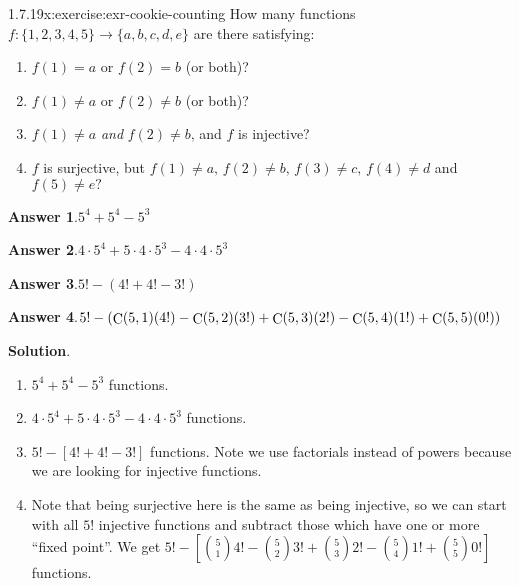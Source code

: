 \documentclass[twoside,11pt,]{book}
\newcommand{\blocktitlefont}{\relax}
\numberwithin{equation}{chapter}
\begin{document}
\begin{divisionsolution}{1.7.19}{}{x:exercise:exr-cookie-counting}%
How many functions \(f: \{1,2,3,4,5\} \to \{a,b,c,d,e\}\) are there satisfying:%
\begin{enumerate}[label=(\alph*)]
\item{}\(f(1) = a\) or \(f(2) = b\) (or both)?%
\item{}\(f(1) \ne a\) or \(f(2) \ne b\) (or both)?%
\item{}\(f(1) \ne a\) \emph{and} \(f(2) \ne b\text{,}\) and \(f\) is injective?%
\item{}\(f\) is surjective, but \(f(1) \ne a\text{,}\) \(f(2) \ne b\text{,}\) \(f(3) \ne c\text{,}\) \(f(4) \ne d\) and \(f(5) \ne e\text{?}\)%
\end{enumerate}
%
\par\smallskip%
\noindent\textbf{\blocktitlefont Answer 1}.\quad{}\(5^{4}+5^{4}-5^{3}\)%
\par\smallskip%
\noindent\textbf{\blocktitlefont Answer 2}.\quad{}\(4\cdot 5^{4}+5\cdot 4\cdot 5^{3}-4\cdot 4\cdot 5^{3}\)%
\par\smallskip%
\noindent\textbf{\blocktitlefont Answer 3}.\quad{}\(5!-\left(4!+4!-3!\right)\)%
\par\smallskip%
\noindent\textbf{\blocktitlefont Answer 4}.\quad{}\(5!-\left(\mathop{\rm C}\nolimits\!\left(5,1\right)\!\left(4!\right)-\mathop{\rm C}\nolimits\!\left(5,2\right)\!\left(3!\right)+\mathop{\rm C}\nolimits\!\left(5,3\right)\!\left(2!\right)-\mathop{\rm C}\nolimits\!\left(5,4\right)\!\left(1!\right)+\mathop{\rm C}\nolimits\!\left(5,5\right)\!\left(0!\right)\right)\)%
\par\smallskip%
\noindent\textbf{\blocktitlefont Solution}.\quad{}%
\begin{enumerate}[label=(\alph*)]
\item{}\(5^4 + 5^4 - 5^3\) functions.%
\item{}\(4\cdot 5^4 + 5 \cdot 4 \cdot 5^3 - 4 \cdot 4 \cdot 5^3\) functions.%
\item{}\(5! - \left[ 4! + 4! - 3! \right]\) functions. Note we use factorials instead of powers because we are looking for injective functions.%
\item{}Note that being surjective here is the same as being injective, so we can start with all \(5!\) injective functions and subtract those which have one or more ``fixed point''. We get \(5! - \left[{5 \choose 1}4! - {5 \choose 2}3! + {5 \choose 3}2! - {5 \choose 4}1! + {5 \choose 5} 0!\right]\) functions.%
\end{enumerate}
%
\end{divisionsolution}%
\end{document}
